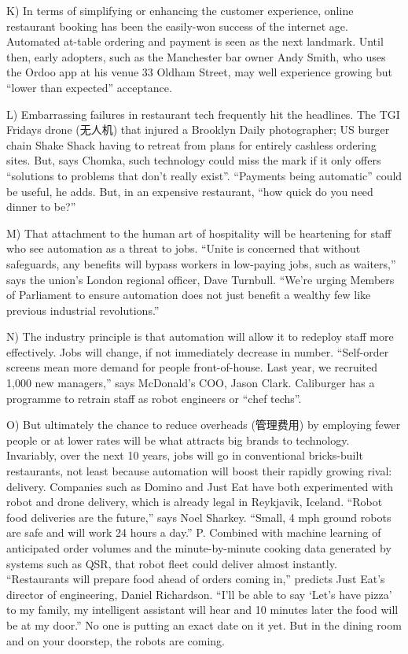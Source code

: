 \documentclass[UTF8,11pt]{ctexart}
\begin{document}
K) In terms of simplifying or enhancing the customer experience, online restaurant booking has been the easily-won success of the internet age. Automated at-table ordering and payment is seen as the next landmark. Until then, early adopters, such as the Manchester bar owner Andy Smith, who uses the Ordoo app at his venue 33 Oldham Street, may well experience growing but “lower than expected” acceptance.


L) Embarrassing failures in restaurant tech frequently hit the headlines. The TGI Fridays drone (无人机) that injured a Brooklyn Daily photographer; US burger chain Shake Shack having to retreat from plans for entirely cashless ordering sites. But, says Chomka, such technology could miss the mark if it only offers “solutions to problems that don’t really exist”. “Payments being automatic” could be useful, he adds. But, in an expensive restaurant, “how quick do you need dinner to be?”


M) That attachment to the human art of hospitality will be heartening for staff who see automation as a threat to jobs. “Unite is concerned that without safeguards, any benefits will bypass workers in low-paying jobs, such as waiters,” says the union’s London regional officer, Dave Turnbull. “We’re urging Members of Parliament to ensure automation does not just benefit a wealthy few like previous industrial revolutions.”


N) The industry principle is that automation will allow it to redeploy staff more effectively. Jobs will change, if not immediately decrease in number. “Self-order screens mean more demand for people front-of-house. Last year, we recruited 1,000 new managers,” says McDonald’s COO, Jason Clark. Caliburger has a programme to retrain staff as robot engineers or “chef techs”.


O) But ultimately the chance to reduce overheads (管理费用) by employing fewer people or at lower rates will be what attracts big brands to technology. Invariably, over the next 10 years, jobs will go in conventional bricks-built restaurants, not least because automation will boost their rapidly growing rival: delivery. Companies such as Domino and Just Eat have both experimented with robot and drone delivery, which is already legal in Reykjavik, Iceland. “Robot food deliveries are the future,” says Noel Sharkey. “Small, 4 mph ground robots are safe and will work 24 hours a day.” P. Combined with machine learning of anticipated order volumes and the minute-by-minute cooking data generated by systems such as QSR, that robot fleet could deliver almost instantly. “Restaurants will prepare food ahead of orders coming in,” predicts Just Eat’s director of engineering, Daniel Richardson. “I’ll be able to say ‘Let’s have pizza’ to my family, my intelligent assistant will hear and 10 minutes later the food will be at my door.” No one is putting an exact date on it yet. But in the dining room and on your doorstep, the robots are coming.
\end{document}
